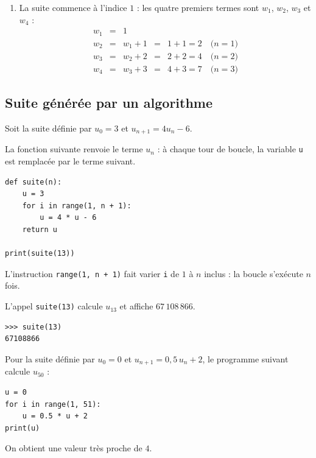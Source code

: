 \begin{methode}
\begin{correction}
\begin{enumerate}
			\item La suite commence à l'indice $1$ : les quatre premiers termes sont $w_1$, $w_2$, $w_3$ et $w_4$ :
			      \[
				      \begin{array}{rclcl}
					      w_1 & = & 1       &   &                                  \\
					      w_2 & = & w_1 + 1 & = & 1 + 1 = 2 \quad \text{($n = 1$)} \\
					      w_3 & = & w_2 + 2 & = & 2 + 2 = 4 \quad \text{($n = 2$)} \\
					      w_4 & = & w_3 + 3 & = & 4 + 3 = 7 \quad \text{($n = 3$)}
				      \end{array}
			      \]
		\end{enumerate}
	\end{correction}
\end{methode}

\subsection{Suite générée par un algorithme}

\begin{ex}
	Soit la suite définie par $u_0 = 3$ et $u_{n+1} = 4u_n - 6$.

	La fonction suivante renvoie le terme $u_n$ : à chaque tour de boucle, la variable \texttt{u} est remplacée par le terme suivant.

	\begin{lstlisting}
def suite(n):
    u = 3
    for i in range(1, n + 1):
        u = 4 * u - 6
    return u

print(suite(13))
\end{lstlisting}
	L'instruction \texttt{range(1, n + 1)} fait varier \texttt{i} de $1$ à $n$ inclus : la boucle s'exécute $n$ fois.

	L'appel \texttt{suite(13)} calcule $u_{13}$ et affiche $67\,108\,866$.
	\begin{lstlisting}
>>> suite(13)
67108866
\end{lstlisting}
\end{ex}

\begin{ex}
	Pour la suite définie par $u_0 = 0$ et $u_{n+1} = 0{,}5\,u_n + 2$, le programme suivant calcule $u_{50}$ :

	\begin{lstlisting}
u = 0
for i in range(1, 51):
    u = 0.5 * u + 2
print(u)
\end{lstlisting}

	On obtient une valeur très proche de $4$.
\end{ex}

